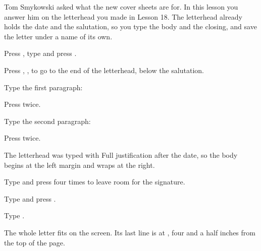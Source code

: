 Tom Smykowski asked what the new cover sheets are for.  In this lesson you
answer him on the letterhead you made in Lesson 18.  The letterhead already
holds the date and the salutation, so you type the body and the closing,
and save the letter under a name of its own.

\begin{WPSteps}
\item Press , type  and press
.
\item Press , ,  to go to the end
of the letterhead, below the salutation.
\end{WPSteps}

\begin{WPSteps}
\item Type the first paragraph:
\item Press  twice.
\item Type the second paragraph:
\item Press  twice.
\end{WPSteps}
The letterhead was typed with Full justification after the date, so the
body begins at the left margin and wraps at the right.

\begin{WPSteps}
\item Type  and press  four times to
leave room for the signature.
\item Type  and press .
\item Type .
\end{WPSteps}
The whole letter fits on the screen.  Its last line is at ,
four and a half inches from the top of the page.

